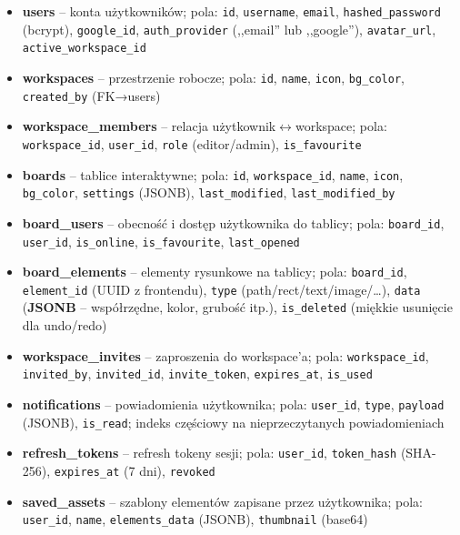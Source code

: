 \documentclass[12pt,a4paper]{article}
\begin{document}
\begin{itemize}[leftmargin=*]
    \item \textbf{users} -- konta użytkowników; pola: \texttt{id}, \texttt{username}, \texttt{email}, \texttt{hashed\_password} (bcrypt), \texttt{google\_id}, \texttt{auth\_provider} (,,email'' lub ,,google''), \texttt{avatar\_url}, \texttt{active\_workspace\_id}
    \item \textbf{workspaces} -- przestrzenie robocze; pola: \texttt{id}, \texttt{name}, \texttt{icon}, \texttt{bg\_color}, \texttt{created\_by} (FK→users)
    \item \textbf{workspace\_members} -- relacja użytkownik$\leftrightarrow$workspace; pola: \texttt{workspace\_id}, \texttt{user\_id}, \texttt{role} (editor/admin), \texttt{is\_favourite}
    \item \textbf{boards} -- tablice interaktywne; pola: \texttt{id}, \texttt{workspace\_id}, \texttt{name}, \texttt{icon}, \texttt{bg\_color}, \texttt{settings} (JSONB), \texttt{last\_modified}, \texttt{last\_modified\_by}
    \item \textbf{board\_users} -- obecność i dostęp użytkownika do tablicy; pola: \texttt{board\_id}, \texttt{user\_id}, \texttt{is\_online}, \texttt{is\_favourite}, \texttt{last\_opened}
    \item \textbf{board\_elements} -- elementy rysunkowe na tablicy; pola: \texttt{board\_id}, \texttt{element\_id} (UUID z frontendu), \texttt{type} (path/rect/text/image/\ldots), \texttt{data} (\textbf{JSONB} -- współrzędne, kolor, grubość itp.), \texttt{is\_deleted} (miękkie usunięcie dla undo/redo)
    \item \textbf{workspace\_invites} -- zaproszenia do workspace'a; pola: \texttt{workspace\_id}, \texttt{invited\_by}, \texttt{invited\_id}, \texttt{invite\_token}, \texttt{expires\_at}, \texttt{is\_used}
    \item \textbf{notifications} -- powiadomienia użytkownika; pola: \texttt{user\_id}, \texttt{type}, \texttt{payload} (JSONB), \texttt{is\_read}; indeks częściowy na nieprzeczytanych powiadomieniach
    \item \textbf{refresh\_tokens} -- refresh tokeny sesji; pola: \texttt{user\_id}, \texttt{token\_hash} (SHA-256), \texttt{expires\_at} (7 dni), \texttt{revoked}
    \item \textbf{saved\_assets} -- szablony elementów zapisane przez użytkownika; pola: \texttt{user\_id}, \texttt{name}, \texttt{elements\_data} (JSONB), \texttt{thumbnail} (base64)
\end{itemize}
\end{document}
